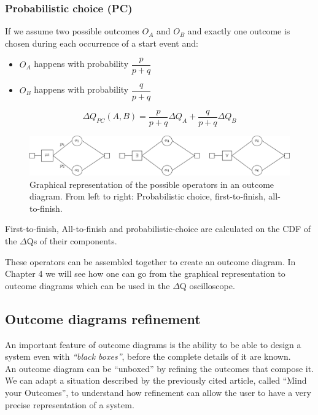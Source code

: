     \subsubsection{Probabilistic choice (PC)}
        If we assume two possible outcomes $O_A$ and $O_B$ and exactly one outcome is chosen during each occurrence of a start event and:
        \begin{itemize}
            \item $O_A$ happens with probability $\dfrac{p}{p+q}$
            \item $O_B$ happens with probability $\dfrac{q}{p + q}$
        \end{itemize}
        \begin{equation}
           \Delta Q_{PC}(A, B) = \dfrac{p}{p + q}\Delta Q_A + \dfrac{q}{p + q}\Delta Q_B 
            \label{eq:pc}
        \end{equation} 

    \begin{figure}[H]
        \begin{center}
            \includegraphics[width = \textwidth]{tikz/op.pdf}
        \end{center}
        \caption{Graphical representation of the possible operators in an outcome diagram. From left to right: Probabilistic choice, first-to-finish, all-to-finish. \cite{myo}}
        \label{fig:op}
    \end{figure}
    First-to-finish, All-to-finish and probabilistic-choice are calculated on the CDF of the $\Delta$Qs of their components.
    
    These operators can be assembled together to create an outcome diagram. In Chapter 4 we will see how one can go from the graphical representation to outcome diagrams which can be used in the $\Delta$Q oscilloscope.
    
    \subsection{Outcome diagrams refinement}
        An important feature of outcome diagrams is the ability to be able to design a system even with \textit{``black boxes''}, before the complete details of it are known. \cite{myo} \\
        An outcome diagram can be ``unboxed'' by refining the outcomes that compose it. We can adapt a situation described by the previously cited article, called ``Mind your Outcomes'', to understand how refinement can allow the user to have a very precise representation of a system. 
        
